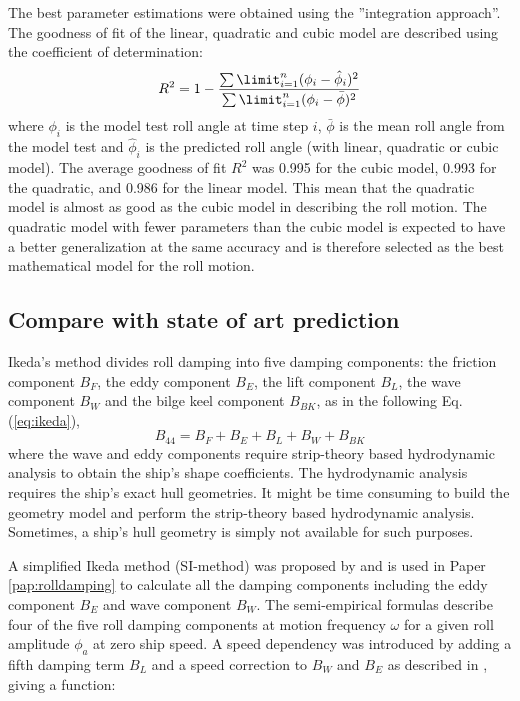 \noindent The best parameter estimations were obtained using the ''integration approach''.
The goodness of fit of the linear, quadratic and cubic model are described using the coefficient of determination:
\begin{equation} \label{eq:R2}
R^2=1-\frac{\sum\limit_{i=1}^{n}(\phi_{i}-\hat{\phi}_i)^2}{\sum\limit_{i=1}^{n}(\phi_i-\bar \phi)^2}
\end{equation}
where $\phi_i$ is the model test roll angle at time step $i$, $\bar \phi$ is the mean roll angle from the model test and $\hat{\phi}_i$ is the predicted roll angle (with linear, quadratic or cubic model). The average goodness of fit $R^2$ was 0.995 for the cubic model, 0.993 for the quadratic, and 0.986 for the linear model. This mean that the quadratic model is almost as good as the cubic model in describing the roll motion. The quadratic model with fewer parameters than the cubic model is expected to have a better generalization at the same accuracy and is therefore selected as the best mathematical model for the roll motion. 

\subsection{Compare with state of art prediction}
Ikeda's method divides roll damping into five damping components: the friction component $B_F$, the eddy component $B_E$, the lift component $B_L$, the wave component $B_W$ and the bilge keel component $B_{BK}$, as in the following Eq.(\ref{eq:ikeda}), 
\begin{equation} \label{eq:ikeda}
B_{44} = B_F + B_E + B_L + B_W + B_{BK}
\end{equation}
where the wave and eddy components require strip-theory based hydrodynamic analysis to obtain the ship's shape coefficients. The hydrodynamic analysis requires the ship's exact hull geometries. It might be time consuming to build the geometry model and perform the strip-theory based hydrodynamic analysis. Sometimes, a ship's hull geometry is simply not available for such purposes. 

A simplified Ikeda method (SI-method) was proposed by \parencite{kawahara_simple_2011} and is used in Paper \ref{pap:rolldamping} to calculate all the damping components including the eddy component $B_E$ and wave component $B_W$. The semi-empirical formulas describe four of the five roll damping components at motion frequency $\omega$ for a given roll amplitude $\phi_a$ at zero ship speed. A speed dependency was introduced by adding a fifth damping term $B_L$ and a speed correction to $B_W$ and $B_E$ as described in \parencite{ikeda_velocity_1979}, giving a function: 


